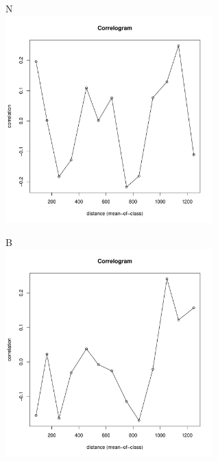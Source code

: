 	\begin{figure}[h]

	\begin{minipage}[b]{.46\linewidth}
	\begin{center}
	{\small N}\\
		\includegraphics[width=80mm]{../Barenc_Sea/distribution_Moran/Plyazh07_moran_N_Macoma_balthica_.pdf}
	\end{center}
	\end{minipage}
%
	\hfil %
%
	\begin{minipage}[b]{.46\linewidth}
	\begin{center}
	{\small B}\\
		\includegraphics[width=80mm]{../Barenc_Sea/distribution_Moran/Plyazh07_moran_B_Macoma_balthica_.pdf}
	\end{center}
	\end{minipage}
	

\end{figure}
